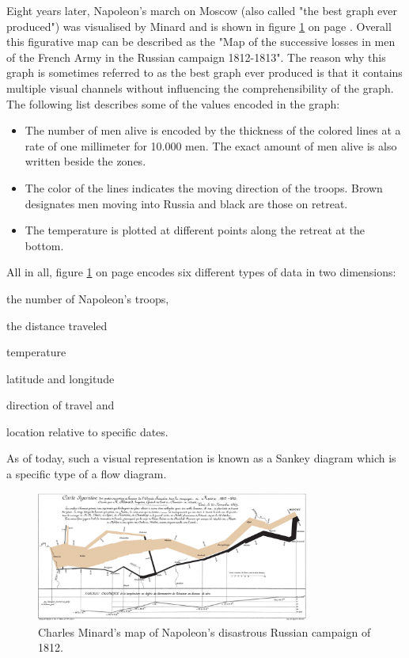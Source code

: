 Eight years later, Napoleon's march on Moscow (also called "the best graph ever produced") was visualised by Minard and is shown in figure \ref{fig:minard2} on page \pageref{fig:minard2}. Overall this figurative map can be described as the "Map of the successive losses in men of the French Army in the Russian campaign 1812-1813". The reason why this graph is sometimes referred to as the best graph ever produced is that it contains multiple visual channels without influencing the comprehensibility of the graph. The following list describes some of the values encoded in the graph:
\begin{itemize}
\item The number of men alive is encoded by the thickness of the colored lines at a rate of one millimeter for 10.000 men. The exact amount of men alive is also written beside the zones.
\item The color of the lines indicates the moving direction of the troops. Brown designates men moving into Russia and black are those on retreat.
\item The temperature is plotted at different points along the retreat at the bottom.
\end{itemize}
All in all, figure \ref{fig:minard2} on page \pageref{fig:minard2} encodes six different types of data in two dimensions:
\begin{enumerate*}[label={(\arabic*)]
\item the number of Napoleon's troops,
\item the distance traveled
\item temperature
\item latitude and longitude
\item direction of travel and
\item location relative to specific dates.
\end{enumerate*}
As of today, such a visual representation is known as a Sankey diagram which is a specific type of a flow diagram.

\begin{figure}[!htb]
\centering
\includegraphics[width=0.8\textwidth,keepaspectratio]{images/history/minard2.png}
\caption[
    Charles Minard's map of Napoleon's disastrous Russian campaign of 1812., Urldate: 07.2016 \newline
\small\texttt{\url{https://upload.wikimedia.org/wikipedia/commons/2/29/Minard.png}}
]{Charles Minard's map of Napoleon's disastrous Russian campaign of 1812.}
\label{fig:minard2}
\end{figure}

